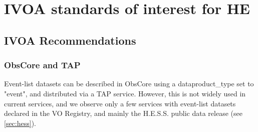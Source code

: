 \documentclass[11pt,a4paper]{ivoa}
\begin{document}
{%
%
%
%
%


\section{IVOA standards of interest for HE}

\subsection{IVOA Recommendations}
\label{sec:vorecs}

\subsubsection{ObsCore and TAP}
\label{sec:vorecs_obscore}

Event-list datasets can be described in ObsCore using a dataproduct\_type set to "event", and distributed via a TAP service. However, this is not widely used in current services, and we observe only a few services with event-list datasets declared in the VO Registry, and mainly the H.E.S.S. public data release (see \ref{sec:hess}).

}
\end{document}
